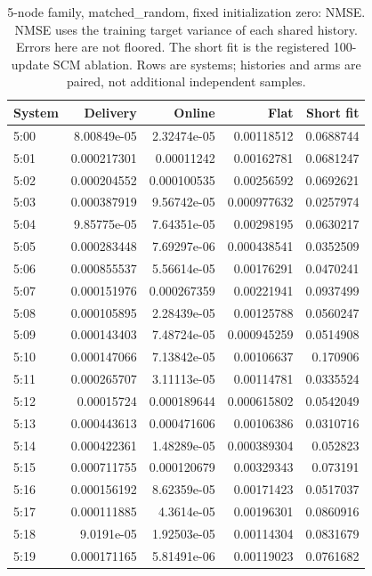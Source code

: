 \begin{table}[ht]
\centering\scriptsize
\begin{tabular}{lrrrr}
\toprule
System & Delivery & Online & Flat & Short fit\\
\midrule
5:00 & 8.00849e-05 & 2.32474e-05 & 0.00118512 & 0.0688744\\
5:01 & 0.000217301 & 0.00011242 & 0.00162781 & 0.0681247\\
5:02 & 0.000204552 & 0.000100535 & 0.00256592 & 0.0692621\\
5:03 & 0.000387919 & 9.56742e-05 & 0.000977632 & 0.0257974\\
5:04 & 9.85775e-05 & 7.64351e-05 & 0.00298195 & 0.0630217\\
5:05 & 0.000283448 & 7.69297e-06 & 0.000438541 & 0.0352509\\
5:06 & 0.000855537 & 5.56614e-05 & 0.00176291 & 0.0470241\\
5:07 & 0.000151976 & 0.000267359 & 0.00221941 & 0.0937499\\
5:08 & 0.000105895 & 2.28439e-05 & 0.00125788 & 0.0560247\\
5:09 & 0.000143403 & 7.48724e-05 & 0.000945259 & 0.0514908\\
5:10 & 0.000147066 & 7.13842e-05 & 0.00106637 & 0.170906\\
5:11 & 0.000265707 & 3.11113e-05 & 0.00114781 & 0.0335524\\
5:12 & 0.00015724 & 0.000189644 & 0.000615802 & 0.0542049\\
5:13 & 0.000443613 & 0.000471606 & 0.00106386 & 0.0310716\\
5:14 & 0.000422361 & 1.48289e-05 & 0.000389304 & 0.052823\\
5:15 & 0.000711755 & 0.000120679 & 0.00329343 & 0.073191\\
5:16 & 0.000156192 & 8.62359e-05 & 0.00171423 & 0.0517037\\
5:17 & 0.000111885 & 4.3614e-05 & 0.00196301 & 0.0860916\\
5:18 & 9.0191e-05 & 1.92503e-05 & 0.00114304 & 0.0831679\\
5:19 & 0.000171165 & 5.81491e-06 & 0.00119023 & 0.0761682\\
\bottomrule
\end{tabular}
\caption{5-node family, matched\_random, fixed initialization zero: NMSE. NMSE uses the training target variance of each shared history. Errors here are not floored. The short fit is the registered 100-update SCM ablation. Rows are systems; histories and arms are paired, not additional independent samples.}
\end{table}
